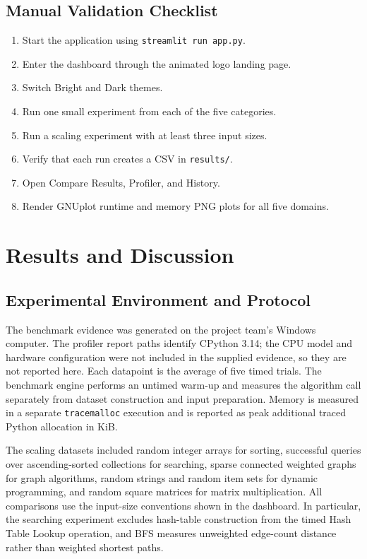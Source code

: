 \documentclass[11pt,a4paper]{report}
\begin{document}
\section{Manual Validation Checklist}
\begin{enumerate}
    \item Start the application using \texttt{streamlit run app.py}.
    \item Enter the dashboard through the animated logo landing page.
    \item Switch Bright and Dark themes.
    \item Run one small experiment from each of the five categories.
    \item Run a scaling experiment with at least three input sizes.
    \item Verify that each run creates a CSV in \texttt{results/}.
    \item Open Compare Results, Profiler, and History.
    \item Render GNUplot runtime and memory PNG plots for all five domains.
\end{enumerate}

\chapter{Results and Discussion}

\section{Experimental Environment and Protocol}
The benchmark evidence was generated on the project team's Windows computer.
The profiler report paths identify CPython 3.14; the CPU model and hardware
configuration were not included in the supplied evidence, so they are not
reported here. Each datapoint is the average of five timed trials. The
benchmark engine performs an untimed warm-up and measures the algorithm call
separately from dataset construction and input preparation. Memory is measured
in a separate \texttt{tracemalloc} execution and is reported as peak additional
traced Python allocation in KiB.

The scaling datasets included random integer arrays for sorting, successful
queries over ascending-sorted collections for searching, sparse connected
weighted graphs for graph algorithms, random strings and random item sets for
dynamic programming, and random square matrices for matrix multiplication.
All comparisons use the input-size conventions shown in the dashboard. In
particular, the searching experiment excludes hash-table construction from
the timed Hash Table Lookup operation, and BFS measures unweighted
edge-count distance rather than weighted shortest paths.
\end{document}
